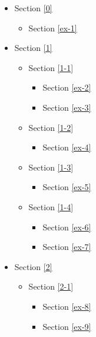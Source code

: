 \documentclass[11pt]{article}
\providecommand{\tightlist}{%
      \setlength{\itemsep}{0pt}\setlength{\parskip}{0pt}}
\begin{document}
\begin{itemize}
\tightlist
\item
  Section \ref{0}

  \begin{itemize}
  \tightlist
  \item
    Section \ref{ex-1}
  \end{itemize}
\item
  Section \ref{1}

  \begin{itemize}
  \tightlist
  \item
    Section \ref{1-1}

    \begin{itemize}
    \tightlist
    \item
      Section \ref{ex-2}
    \item
      Section \ref{ex-3}
    \end{itemize}
  \item
    Section \ref{1-2}

    \begin{itemize}
    \tightlist
    \item
      Section \ref{ex-4}
    \end{itemize}
  \item
    Section \ref{1-3}

    \begin{itemize}
    \tightlist
    \item
      Section \ref{ex-5}
    \end{itemize}
  \item
    Section \ref{1-4}

    \begin{itemize}
    \tightlist
    \item
      Section \ref{ex-6}
    \item
      Section \ref{ex-7}
    \end{itemize}
  \end{itemize}
\item
  Section \ref{2}

  \begin{itemize}
  \tightlist
  \item
    Section \ref{2-1}

    \begin{itemize}
    \tightlist
    \item
      Section \ref{ex-8}
    \item
      Section \ref{ex-9}
    \end{itemize}
  \end{itemize}
\end{itemize}
\end{document}
